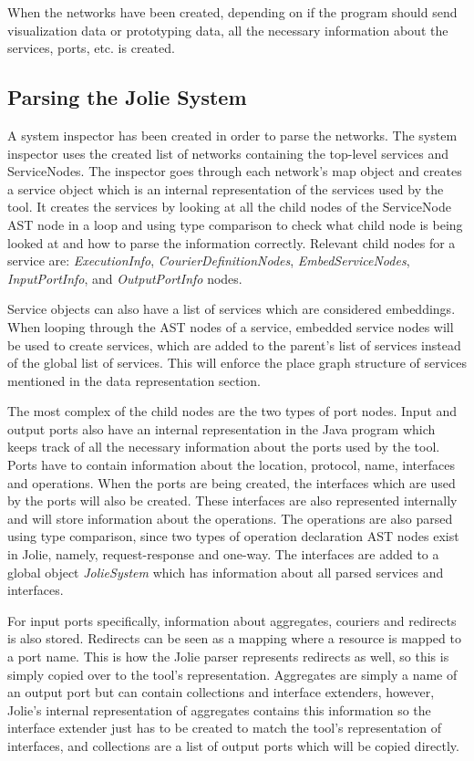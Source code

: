 When the networks have been created, depending on if the program should send visualization data or prototyping data, all the necessary information about the services, ports, etc. is created.
\subsection{Parsing the Jolie System}
A system inspector has been created in order to parse the networks.
The system inspector uses the created list of networks containing the top-level services and ServiceNodes.
The inspector goes through each network's map object and creates a service object which is an internal representation of the services used by the tool.
It creates the services by looking at all the child nodes of the ServiceNode AST node in a loop and using type comparison to check what child node is being looked at and how to parse the information correctly.
Relevant child nodes for a service are: \textit{ExecutionInfo}, \textit{CourierDefinitionNodes}, \textit{EmbedServiceNodes}, \textit{InputPortInfo}, and \textit{OutputPortInfo} nodes.

Service objects can also have a list of services which are considered embeddings. When looping through the AST nodes of a service, embedded service nodes will be used to create services, which are added to the parent's list of services instead of the global list of services.
This will enforce the place graph structure of services mentioned in the data representation section.

The most complex of the child nodes are the two types of port nodes. Input and output ports also have an internal representation in the Java program which keeps track of all the necessary information about the ports used by the tool.
Ports have to contain information about the location, protocol, name, interfaces and operations.
When the ports are being created, the interfaces which are used by the ports will also be created. These interfaces are also represented internally and will store information about the operations.
The operations are also parsed using type comparison, since two types of operation declaration AST nodes exist in Jolie, namely, request-response and one-way.
The interfaces are added to a global object \textit{JolieSystem} which has information about all parsed services and interfaces.

For input ports specifically, information about aggregates, couriers and redirects is also stored. Redirects can be seen as a mapping where a resource is mapped to a port name. This is how the Jolie parser represents redirects as well, so this is simply copied over to the tool's representation.
Aggregates are simply a name of an output port but can contain collections and interface extenders, however, Jolie's internal representation of aggregates contains this information so the interface extender just has to be created to match the tool's representation of interfaces, and collections are a list of output ports which will be copied directly.

